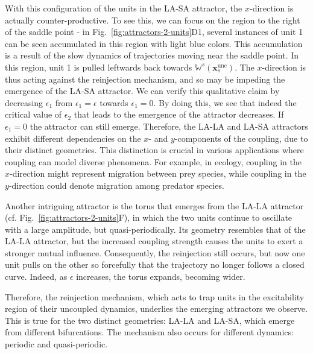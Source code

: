 With this configuration of the units in the LA-SA attractor, the $x$-direction is actually counter-productive. To see this, we can focus on the region to the right of the saddle point - in Fig.~\ref{fig:attractors-2-units}D1, several instances of unit 1 can be seen accumulated in this region with light blue colors. This accumulation is a result of the slow dynamics of trajectories moving near the saddle point. In this region, unit 1 is pulled leftwards back towards $\mathbb{W}^s(\mathbf{x}_s^\mathrm{unc})$. The $x$-direction is thus acting against the reinjection mechanism, and so may be impeding the emergence of the LA-SA attractor. We can verify this qualitative claim by decreasing $\epsilon_1$ from $\epsilon_1=\epsilon$ towards $\epsilon_1 = 0$. By doing this, we see that indeed the critical value of $\epsilon_2$ that leads to the emergence of the attractor decreases. If $\epsilon_1=0$ the attractor can still emerge. Therefore, the LA-LA and LA-SA attractors exhibit different dependencies on the $x$- and $y$-components of the coupling, due to their distinct geometries. This distinction is crucial in various applications where coupling can model diverse phenomena. For example, in ecology, coupling in the $x$-direction might represent migration between prey species, while coupling in the $y$-direction could denote migration among predator species.

Another intriguing attractor is the torus that emerges from the LA-LA attractor (cf. Fig.~\ref{fig:attractors-2-units}F), in which the two units continue to oscillate with a large amplitude, but quasi-periodically. Its geometry resembles that of the LA-LA attractor, but the increased coupling strength causes the units to exert a stronger mutual influence. Consequently, the reinjection still occurs, but now one unit pulls on the other so forcefully that the trajectory no longer follows a closed curve. Indeed, as $\epsilon$ increases, the torus expands, becoming wider.

Therefore, the reinjection mechanism, which acts to trap units in the excitability region of their uncoupled dynamics, underlies the emerging attractors we observe. This is true for the two distinct geometries: LA-LA and LA-SA, which emerge from different bifurcations. The mechanism also occurs for different dynamics: periodic and quasi-periodic.

